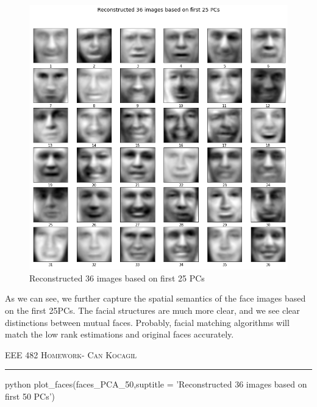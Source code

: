\documentclass[12pt]{amsart}
\begin{document}
\begin{figure}[h]
    \centering
        \includegraphics[width = 1\textwidth]{images/Q1/Reconstructed 36 images based on first 25 PCs.png}
        \caption{Reconstructed 36 images based on first 25 PCs}
\end{figure}

As we can see, we further capture the spatial semantics of the face images based on the first 25PCs. The facial structures are much more clear, and we see clear distinctions between mutual faces. Probably, facial matching algorithms will match the low rank estimations and original faces accurately. 


\newpage
{\scshape EEE 482} \hfill {\scshape \large  Homework-\relax} \hfill {\scshape Can Kocagil}
\smallskip
\hrule
\vspace{2mm}

\begin{mintedbox}{python}
plot_faces(faces_PCA_50,suptitle = 'Reconstructed 36 images based on first 50 PCs')
\end{mintedbox}
\end{document}
